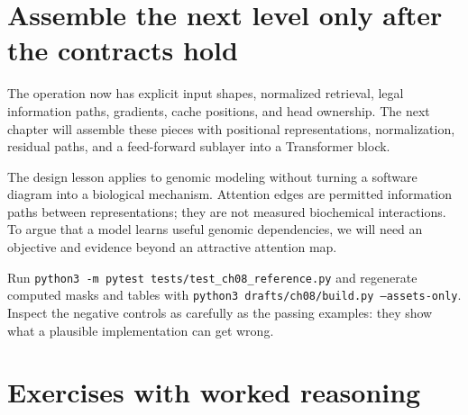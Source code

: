 \section{Assemble the next level only after the contracts hold}

The operation now has explicit input shapes, normalized retrieval, legal information paths, gradients, cache positions, and head ownership. The next chapter will assemble these pieces with positional representations, normalization, residual paths, and a feed-forward sublayer into a Transformer block.

The design lesson applies to genomic modeling without turning a software diagram into a biological mechanism. Attention edges are permitted information paths between representations; they are not measured biochemical interactions. To argue that a model learns useful genomic dependencies, we will need an objective and evidence beyond an attractive attention map.

Run \texttt{python3 -m pytest tests/test\_ch08\_reference.py} and regenerate computed masks and tables with \texttt{python3 drafts/ch08/build.py --assets-only}. Inspect the negative controls as carefully as the passing examples: they show what a plausible implementation can get wrong.

\section{Exercises with worked reasoning}

